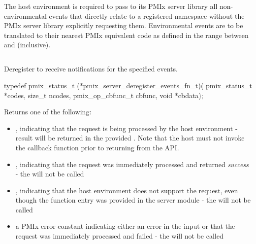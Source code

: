\adviceimplend

\advicermstart
The host environment is required to pass to its \ac{PMIx} server library all non-environmental events that directly relate to a registered namespace without the \ac{PMIx} server library explicitly requesting them. Environmental events are to be translated to their nearest \ac{PMIx} equivalent code as defined in the range between  and  (inclusive).
\advicermend


\subsection{}

\summary

Deregister to receive notifications for the specified events.

\format

\cspecificstart
\begin{codepar}
 typedef pmix_status_t (*pmix_server_deregister_events_fn_t)(
                              pmix_status_t *codes,
                              size_t ncodes,
                              pmix_op_cbfunc_t cbfunc,
                              void *cbdata);
\end{codepar}
\cspecificend

\begin{arglist}
\end{arglist}

Returns one of the following:

\begin{itemize}
    \item {}, indicating that the request is being processed by the host environment - result will be returned in the provided . Note that the host must not invoke the callback function prior to returning from the \ac{API}.
    \item {}, indicating that the request was immediately processed and returned \textit{success} - the  will not be called
    \item {}, indicating that the host environment does not support the request, even though the function entry was provided in the server module - the  will not be called
    \item a PMIx error constant indicating either an error in the input or that the request was immediately processed and failed - the  will not be called
\end{itemize}


